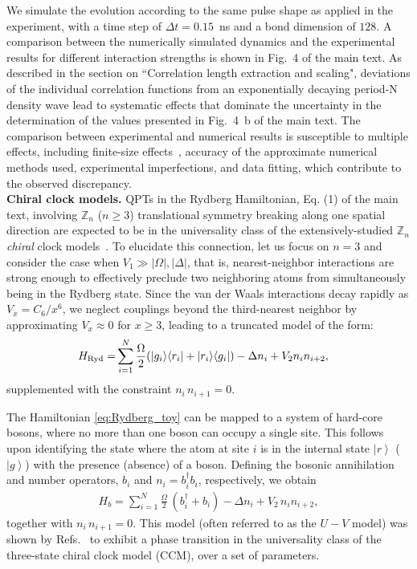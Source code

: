 \documentclass[prl,nobalancelastpage,superscriptaddress,twocolumn,nofootinbib]{revtex4}
\newcommand{\pargap}{\\[12pt]}
\newcommand{\bra}[1]{\langle #1|}
\newcommand{\ket}[1]{\left|#1\right\rangle}
\begin{document}
We simulate the evolution according to the same pulse shape as applied in the experiment, with a time step of $\Delta t=0.15$~ns and a bond dimension of $128$. A comparison between the numerically simulated dynamics and the experimental results for different interaction strengths is shown in Fig.~4 of the main text. As described in the section on ``Correlation length extraction and scaling", deviations of the individual correlation functions from an exponentially decaying period-N density wave lead to systematic effects that dominate the uncertainty in the determination of the values presented in Fig.~4~b of the main text. The comparison between experimental and numerical results is susceptible to multiple effects, including finite-size effects~\cite{Jaschke2017}, accuracy of the approximate numerical methods used, experimental imperfections, and data fitting, which contribute to the observed discrepancy.
\pargap
\noindent\textbf{Chiral clock models.} QPTs in the Rydberg Hamiltonian, Eq. (1) of the main text, involving $\mathbb{Z}_n$ ($n \geq 3$) translational symmetry breaking along one spatial direction are  expected to be in the universality class of the extensively-studied $\mathbb{Z}_n$ {\it chiral} clock models~\cite{Huse1981,Ostlund1981,Huse1982,Huse1983,haldane1983phase,fendley2012parafermionic,Zhuang2015}. To elucidate this connection, let us focus on $n=3$ and consider the case when $V_1\gg \lvert \Omega\rvert,\lvert\Delta\rvert$, that is, nearest-neighbor interactions are strong enough to effectively preclude two neighboring atoms from simultaneously being in the Rydberg state. Since the van der Waals interactions decay rapidly as $V_x =C_6/x^6$, we neglect couplings beyond the third-nearest neighbor by approximating $V_x\approx 0$ for $x\geq 3$, leading to a truncated model of the form: 
\begin{align}\label{eq:Rydberg_toy}
H_{\rm Ryd}=&\sum_{i=1}^N \frac{\Omega}{2} (\ket{g_i}\!\bra{r_i}+\ket{r_i}\!\bra{g_i})-\Delta n_i +V_{2}n_i n_{i+2},
\end{align}
supplemented with the constraint $n_i\,n_{i+1}=0$.

The Hamiltonian \eqref{eq:Rydberg_toy} can be mapped to a system of hard-core bosons, where no more than one boson can occupy a single site. This follows upon identifying the state where the atom at site $i$ is in the internal state $\ket{r}$ ($\ket{g}$) with the presence (absence) of a boson. Defining the bosonic annihilation and number operators, $b_i$ and $n_i=b_i^\dag b_i$, respectively, we obtain
\begin{align}
\label{eq:UV}
H_b=\sum_{i=1}^{N} \frac{\Omega}{2}\,(b_i^\dag+b_i) - \Delta n_i +V_2\, n_i n_{i+2},
\end{align}
together with $n_i \, n_{i+1}=0$. This model (often referred to as the $U-V$ model) was shown by Refs.~\cite{Sachdev2002, Fendley2004} to exhibit a phase transition in the universality class of the three-state chiral clock model (CCM), over a set of parameters. 
\end{document}
